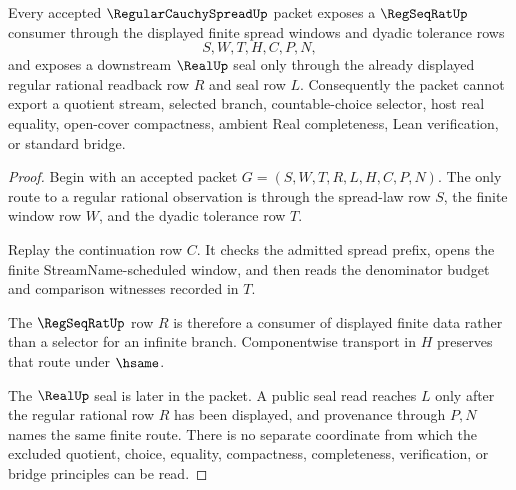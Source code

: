 \begin{theorem}
\label{thm:regular-cauchy-spread-regseqrat-real-handoff}
Every accepted $\RegularCauchySpreadUp$ packet exposes a $\RegSeqRatUp$ consumer through the displayed finite spread windows and dyadic tolerance rows
$$
S,W,T,H,C,P,N,
$$
and exposes a downstream $\RealUp$ seal only through the already displayed regular rational readback row $R$ and seal row $L$. Consequently the packet cannot export a quotient stream, selected branch, countable-choice selector, host real equality, open-cover compactness, ambient Real completeness, Lean verification, or standard bridge.
\end{theorem}
\begin{proof}
Begin with an accepted packet $G=(S,W,T,R,L,H,C,P,N)$. The only route to a regular rational observation is through the spread-law row $S$, the finite window row $W$, and the dyadic tolerance row $T$.

Replay the continuation row $C$. It checks the admitted spread prefix, opens the finite StreamName-scheduled window, and then reads the denominator budget and comparison witnesses recorded in $T$.

The $\RegSeqRatUp$ row $R$ is therefore a consumer of displayed finite data rather than a selector for an infinite branch. Componentwise transport in $H$ preserves that route under $\hsame$.

The $\RealUp$ seal is later in the packet. A public seal read reaches $L$ only after the regular rational row $R$ has been displayed, and provenance through $P,N$ names the same finite route. There is no separate coordinate from which the excluded quotient, choice, equality, compactness, completeness, verification, or bridge principles can be read.
\end{proof}


\begin{closurestatus}{\RegularCauchySpreadUp}
  \theoryclosure{\seedClosure}
  \formalstatus{\unformalizedV}
\end{closurestatus}
